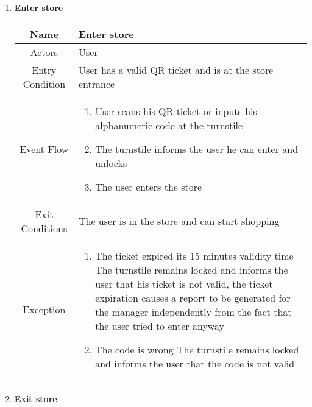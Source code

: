\begin{enumerate}
\begin{table}[H]
{\begin{tabular}{|c|p{14cm}|}
		\hline
	\end{tabular}
}
\end{table}

\item \textbf{Enter store}

\begin{table}[H]
	{
		\begin{tabular}{|c|p{14cm}|}
			\hline
			Name & Enter store\\
			\hline
			Actors & User\\
			\hline
			Entry Condition & User has a valid QR ticket and is at the store entrance\\
			\hline
			
			Event Flow & \begin{enumerate}
				\item User scans his QR ticket or inputs his alphanumeric code at the turnstile
				\item The turnstile informs the user he can enter and unlocks
				\item The user enters the store
				
			\end{enumerate}\\
			
			\hline
			Exit Conditions & The user is in the store and can start shopping\\
			\hline
			
			Exception & \begin{enumerate}
				\item The ticket expired its 15 minutes validity time\newline
				The turnstile remains locked and informs the user that his ticket is not valid, the ticket expiration causes a report to be generated for the manager independently from the fact that the user tried to enter anyway
				
				\item The code is wrong\newline
				The turnstile remains locked and informs the user that the code is not valid

			\end{enumerate}\\
			
			\hline
		\end{tabular}
	}
\end{table}

\item \textbf{Exit store}


\end{enumerate}
